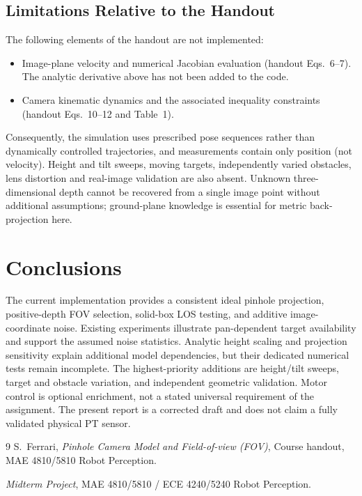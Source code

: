 \documentclass[11pt,letterpaper]{article}
\begin{document}
\subsection{Limitations Relative to the Handout}
The following elements of the handout are not implemented:
\begin{itemize}
    \item Image-plane velocity and numerical Jacobian evaluation (handout Eqs.~6--7). The analytic derivative above has not been added to the code.
    \item Camera kinematic dynamics and the associated inequality constraints (handout Eqs.~10--12 and Table~1).
\end{itemize}
Consequently, the simulation uses prescribed pose sequences rather than dynamically controlled trajectories, and measurements contain only position (not velocity). Height and tilt sweeps, moving targets, independently varied obstacles, lens distortion and real-image validation are also absent. Unknown three-dimensional depth cannot be recovered from a single image point without additional assumptions; ground-plane knowledge is essential for metric back-projection here.

\section{Conclusions}
\label{sec:conclusion}
The current implementation provides a consistent ideal pinhole projection, positive-depth FOV selection, solid-box LOS testing, and additive image-coordinate noise. Existing experiments illustrate pan-dependent target availability and support the assumed noise statistics. Analytic height scaling and projection sensitivity explain additional model dependencies, but their dedicated numerical tests remain incomplete. The highest-priority additions are height/tilt sweeps, target and obstacle variation, and independent geometric validation. Motor control is optional enrichment, not a stated universal requirement of the assignment. The present report is a corrected draft and does not claim a fully validated physical PT sensor.

\begin{thebibliography}{9}
S.~Ferrari, \textit{Pinhole Camera Model and Field-of-view (FOV)}, 
Course handout, MAE 4810/5810 Robot Perception.

\textit{Midterm Project}, MAE 4810/5810 / ECE 4240/5240 Robot Perception.
\end{thebibliography}
\end{document}
